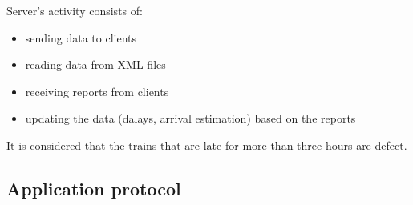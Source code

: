 \documentclass[runningheads]{llncs}
\begin{document}
Server's activity consists of:
\begin{itemize}
    \item sending data to clients
    \item reading data from XML files
    \item receiving reports from clients
    \item updating the data (dalays, arrival estimation) based on the reports
\end{itemize}

It is considered that the trains that are late for more than three hours are defect.


\subsection{Application protocol}
\end{document}
